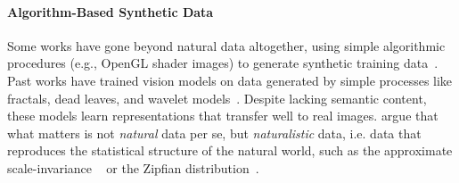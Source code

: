 \documentclass{article}
\theoremstyle{plain}
\theoremstyle{definition}
\theoremstyle{remark}
\begin{document}


\paragraph{Algorithm-Based Synthetic Data}
Some works have gone beyond natural data altogether, using simple algorithmic procedures (e.g., OpenGL shader images) to generate synthetic training data~\citep{baradad2022procedural}. Past works have trained vision models on data generated by simple processes like fractals, dead leaves, and wavelet models~\citep{kataoka2020pre,baradad2021learning,baradad2022procedural}.
Despite lacking semantic content, these models learn representations that transfer well to real images.
\citet{baradad2021learning} argue that what matters is not \textit{natural} data per se, but \textit{naturalistic} data, i.e. data that reproduces the statistical structure of the natural world, such as the approximate scale-invariance ~\citep{field1987relations} or the Zipfian distribution~\citep{zipf1949human,chan2022datadistributionalpropertiesdrive}.
\end{document}
